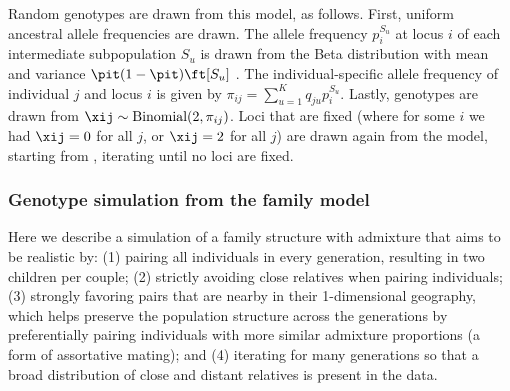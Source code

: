\documentclass[11pt]{article}
\begin{document}
Random genotypes are drawn from this model, as follows.
First, uniform ancestral allele frequencies \pit are drawn.
The allele frequency $p_i^{S_u}$ at locus $i$ of each intermediate subpopulation $S_u$ is drawn from the Beta distribution with mean \pit and variance $\pit(1-\pit) \ft[S_u]$ \citep{balding_method_1995}.
The individual-specific allele frequency of individual $j$ and locus $i$ is given by
$
\pi_{ij} = \sum_{u = 1}^K q_{ju} p_i^{S_u}.
$
Lastly, genotypes are drawn from $\xij \sim \text{Binomial}(2, \pi_{ij})$.
Loci that are fixed (where for some $i$ we had $\xij = 0$ for all $j$, or $\xij = 2$ for all $j$) are drawn again from the model, starting from \pit, iterating until no loci are fixed.

\subsubsection{Genotype simulation from the family model}

Here we describe a simulation of a family structure with admixture that aims to be realistic by:
(1) pairing all individuals in every generation, resulting in two children per couple;
(2) strictly avoiding close relatives when pairing individuals;
(3) strongly favoring pairs that are nearby in their 1-dimensional geography, which helps preserve the population structure across the generations by preferentially pairing individuals with more similar admixture proportions (a form of assortative mating); and
(4) iterating for many generations so that a broad distribution of close and distant relatives is present in the data.
\end{document}
